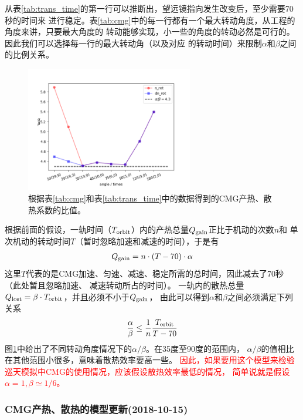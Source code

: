 \documentclass[a4paper,11pt]{ctexart}
\newcommand{\RT}[1]{\textcolor{red}{#1}}
\begin{document}
从表\ref{tab:trans_time}的第一行可以推断出，望远镜指向发生改变后，至少需要70秒的时间来
进行稳定。表\ref{tab:cmg}中的每一行都有一个最大转动角度，从工程的角度来讲，只要最大角度的
转动能够实现，小一些的角度的转动必然是可行的。因此我们可以选择每一行的最大转动角（以及对应
的转动时间）来限制$\alpha$和$\beta$之间的比例关系。

\begin{figure}[h!]
\centering
\includegraphics[width=0.65\textwidth]{figures/CMG_alpha2beta.png}
\caption{根据表\ref{tab:cmg}和表\ref{tab:trans_time}中的数据得到的CMG产热、散热系数的比值。}
\label{fig:cmg_alpha_beta}
\end{figure}

根据前面的假设，一轨时间（$T_{\rm orbit}$）内的产热总量$Q_{\rm gain}$正比于机动的次数$n$和
单次机动的转动时间$T$（暂时忽略加速和减速的时间），于是有
\begin{eqnarray}
Q_{\rm gain} = n\cdot (T-70)\cdot \alpha
\end{eqnarray}
这里$T$代表的是CMG加速、匀速、减速、稳定所需的总时间，因此减去了70秒（此处暂且忽略加速、
减速转动所占的时间）。
一轨内的散热总量$Q_{\rm lost}=\beta\cdot T_{\rm orbit}$，并且必须不小于$Q_{\rm gain}$，
由此可以得到$\alpha$和$\beta$之间必须满足下列关系
\begin{eqnarray}
\frac{\alpha}{\beta} \le \frac{1}{n} \frac{T_{\rm orbit}}{T-70}
\end{eqnarray}
图\ref{fig:cmg_alpha_beta}中给出了不同转动角度情况下的$\alpha / \beta$。在35度至90度的范围内，
$\alpha / \beta$的值相比在其他范围小很多，意味着散热效率要高一些。
\RT{\heiti 因此，如果要用这个模型来检验巡天模拟中CMG的使用情况，应该假设散热效率最低的情况，
简单说就是假设$\alpha=1,\beta\simeq 1/6$。}

\subsubsection{CMG产热、散热的模型更新(2018-10-15)}
\end{document}
